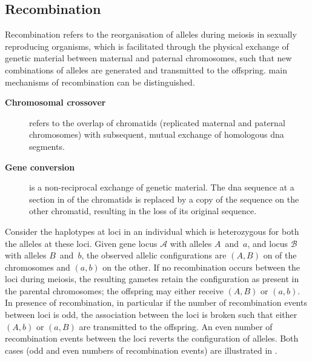%
\subsection{Recombination}
\label{sec:recombination}
%

Recombination refers to the reorganisation of alleles during meiosis in sexually reproducing organisms, which is facilitated through the physical exchange of genetic material between maternal and paternal chromosomes, such that new combinations of alleles are generated and transmitted to the offspring.
 main mechanisms of recombination can be distinguished.
\begin{description}
	\item[\textbf{Chromosomal crossover}] refers to the overlap of  chromatids (replicated maternal and paternal chromosomes) with subsequent, mutual exchange of homologous \gls{dna} segments.
	\item[\textbf{Gene conversion}] is a non-reciprocal exchange of genetic material.
	The \gls{dna} sequence at a section in  of the chromatids is replaced by a copy of the sequence on the other chromatid, resulting in the loss of its original sequence.
\end{description}

%

%

Consider the haplotypes at  loci in an individual which is heterozygous for both the alleles at these loci.
Given gene locus $\mathcal{A}$ with alleles $A$~and~$a$, and locus $\mathcal{B}$ with alleles $B$~and~$b$, the observed allelic configurations are $(A,B)$ on  of the chromosomes and $(a,b)$ on the other.
If no recombination occurs between the  loci during meiosis, the resulting gametes retain the configuration as present in the parental chromosomes; \ie the offspring may either receive $(A,B)$ or $(a,b)$.
In presence of recombination, in particular if the number of recombination events between loci is odd, the association between the  loci is broken such that either $(A,b)$ or $(a,B)$ are transmitted to the offspring.
An even number of recombination events between the  loci reverts the configuration of alleles.
Both cases (odd and even numbers of recombination events) are illustrated in .


